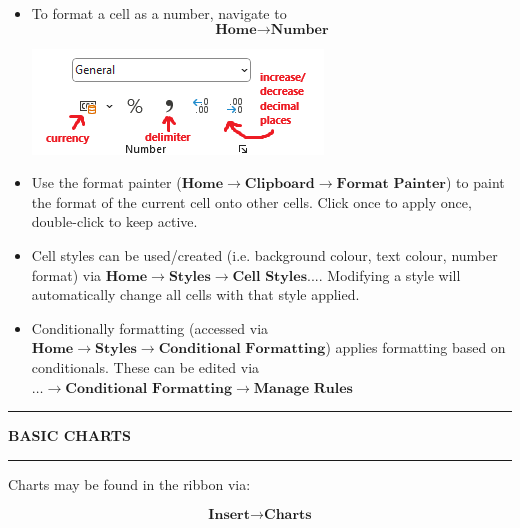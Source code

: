 \documentclass[8pt]{extarticle}
\newcommand{\heading}[1]{%
    \noindent
    \rule{\linewidth}{0.4pt}
    \begin{center}
        \vspace{-1ex}
        \textbf{#1}        
        \vspace{-2.5ex}
    \end{center}
    \rule{\linewidth}{0.4pt}
}
\begin{document}
\begin{multicols}{3}
\begin{itemize}
    \item To format a cell as a number, navigate to 
    \[\textbf{Home} \rightarrow \textbf{Number}\]
        \begin{center}
        \includegraphics[width=0.6\columnwidth]{images/number.png}    
        \end{center}
    \item Use the format painter ($\textbf{Home} \rightarrow \textbf{Clipboard} \rightarrow \textbf{Format Painter}$) to paint the format of the current cell onto other cells. Click once to apply once, double-click to keep active.
    \item Cell styles can be used/created (i.e. background colour, text colour, number format) via $\textbf{Home} \rightarrow \textbf{Styles} \rightarrow \textbf{Cell Styles...}$. Modifying a style will automatically change all cells with that style applied.
    \item Conditionally formatting (accessed via $\textbf{Home} \rightarrow \textbf{Styles} \rightarrow \textbf{Conditional Formatting}$) applies formatting based on conditionals. 
    These can be edited via \newline    
    $\dots \rightarrow \textbf{Conditional Formatting} \rightarrow \textbf{Manage Rules}$
\end{itemize}

\heading{BASIC CHARTS}

Charts may be found in the ribbon via:

\[ \textbf{Insert} \rightarrow \textbf{Charts} \]


\end{multicols}
\end{document}
